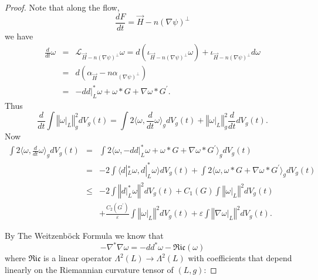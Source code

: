 \documentclass[12pt,letterpaper]{amsart}%
\numberwithin{mycounter}{section}
\theoremstyle{plain}
\numberwithin{equation}{section}
\theoremstyle{definition}
\begin{document}
\begin{proof}
Note that along the flow, 
\begin{equation*}
\frac{dF}{dt}=\vec{H}-n\left( \nabla \psi \right) ^{\perp }
\end{equation*}%
we have  
\begin{eqnarray*}
\frac{d}{dt}\omega  &=&\mathcal{L}_{\vec{H}-n\left( \nabla \psi \right)
^{\perp }}\omega =d\left( \iota _{\vec{H}-n\left( \nabla \psi \right)
^{\perp }}\omega \right) +\iota _{\vec{H}-n\left( \nabla \psi \right)
^{\perp }}d\omega  \\
&=&d\left( \alpha _{\vec{H}}-n\alpha _{\left( \nabla \psi \right) ^{\perp
}}\right)  \\
&=&-dd|_{L}^{\ast }\omega +\omega \ast G+\nabla \omega \ast G^{\prime }.
\end{eqnarray*}%
Thus 
\begin{equation*}
\frac{d}{dt}\int \left\Vert \omega |_{L}\right\Vert _{g}^{2}dV_{g}(t)=\int
2\langle \omega ,\frac{d}{dt}\omega \rangle _{g}dV_{g}(t)+\left\Vert \omega
|_{L}\right\Vert _{g}^{2}\frac{d}{dt}dV_{g}(t).
\end{equation*}%
Now 
\begin{eqnarray*}
\int 2\langle \omega ,\frac{d}{dt}\omega \rangle _{g}dV_{g}(t) &=&\int
2\langle \omega ,-dd|_{L}^{\ast }\omega +\omega \ast G+\nabla \omega \ast
G^{\prime }\rangle _{g}dV_{g}(t) \\
&=&-2\int \langle d|_{L}^{\ast }\omega ,d|_{L}^{\ast }\omega \rangle
dV_{g}(t)+\int 2\langle \omega ,\omega \ast G+\nabla \omega \ast G^{\prime
}\rangle _{g}dV_{g}(t) \\
&\leq &-2\int \left\Vert d|_{L}^{\ast }\omega \right\Vert
^{2}dV_{g}(t)+C_{1}(G)\int \left\Vert \omega |_{L}\right\Vert ^{2}dV_{g}(t)
\\
&&+\frac{C_{2}(G^{\prime })}{\varepsilon }\int \left\Vert \omega
|_{L}\right\Vert ^{2}dV_{g}(t)+\varepsilon \int \left\Vert \nabla \omega
|_{L}\right\Vert ^{2}dV_{g}(t).
\end{eqnarray*}%


\bigskip By The Weitzenb\"{o}ck Formula \cite[Theorem 9.8, see
Definition 9.6, Proposition 9.7 and (2.1.26, 2.1.28, 9.3.1, 1.0.3)\ ]{MMMT}
we know that 
\begin{equation*}
-\nabla ^{\ast }\nabla \omega =-dd^{\ast }\omega -\mathfrak{Ric(\omega )}
\end{equation*}%
where $\mathfrak{Ric}$ is a linear operator $\Lambda ^{2}(L)\rightarrow
\Lambda ^{2}(L)$ with coefficients that depend linearly on the Riemannian
curvature tensor of $\left( L,g\right) $:



\end{proof}
\end{document}
